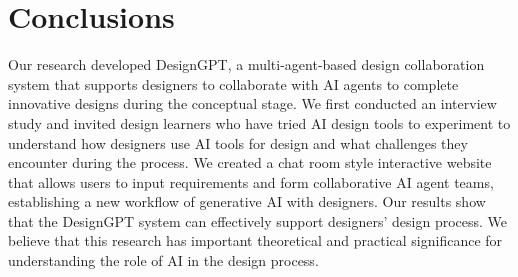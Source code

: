 \documentclass[10pt, conference, compsocconf]{IEEEtran}
\begin{document}
\section{Conclusions}
Our research developed DesignGPT, a multi-agent-based design collaboration system that supports designers to collaborate with AI agents to complete innovative designs during the conceptual stage. We first conducted an interview study and invited design learners who have tried AI design tools to experiment to understand how designers use AI tools for design and what challenges they encounter during the process. We created  a chat room style interactive website that allows users to input requirements and form collaborative AI agent teams, establishing a new workflow of generative AI with designers. Our results show that the DesignGPT system can effectively support designers' design process. We believe that this research has important theoretical and practical significance for understanding the role of AI in the design process.


\end{document}
